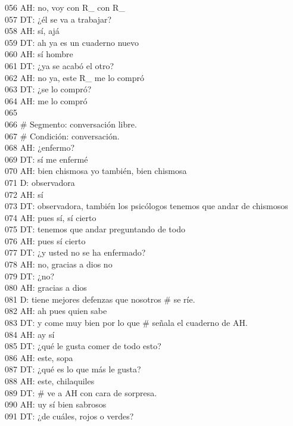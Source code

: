 056 AH: no, voy con R\_ con R\_\\
057 DT: ¿él se va a trabajar?\\
058 AH: sí, ajá\\
059 DT: ah ya es un cuaderno nuevo\\
060 AH: sí hombre\\
061 DT: ¿ya se acabó el otro?\\
062 AH: no ya, este R\_ me lo compró\\
063 DT: ¿se lo compró?\\
064 AH: me lo compró\\
065 \\
066 \# Segmento: conversación libre.\\
067 \# Condición: conversación.\\
068 AH: ¿enfermo?\\
069 DT: sí me enfermé\\
070 AH: bien chismosa yo también, bien chismosa\\
071 D: observadora\\
072 AH: sí\\
073 DT: observadora, también los psicólogos tenemos que andar de chismosos\\
074 AH: pues sí, sí cierto\\
075 DT: tenemos que andar preguntando de todo\\
076 AH: pues sí cierto\\
077 DT: ¿y usted no se ha enfermado?\\
078 AH: no, gracias a dios no\\
079 DT: ¿no?\\
080 AH: gracias a dios\\
081 D: tiene mejores defenzas que nosotros \# se ríe.\\
082 AH: ah pues quien sabe\\
083 DT: y come muy bien por lo que \# señala el cuaderno de AH.\\
084 AH: ay sí\\
085 DT: ¿qué le gusta comer de todo esto?\\
086 AH: este, sopa\\
087 DT: ¿qué es lo que más le gusta?\\
088 AH: este, chilaquiles\\
089 DT: \# ve a AH con cara de sorpresa.\\
090 AH: uy sí bien sabrosos\\
091 DT: ¿de cuáles, rojos o verdes?\\
